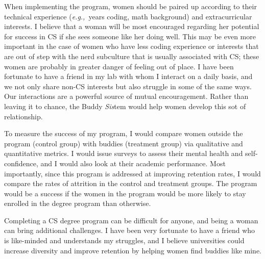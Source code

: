 \documentclass{article}
\newcommand{\eg}{{\em e.g.,}~}
\begin{document}
When implementing the program, women should be paired up according to their technical experience (\eg years coding, math background) and extracurricular interests.
I believe that a woman will be most encouraged regarding her potential for success in CS if she sees someone like her doing well.
This may be even more important in the case of women who have less coding experience or interests that are out of step with the nerd subculture that is usually associated with CS; these women are probably in greater danger of feeling out of place.
I have been fortunate to have a friend in my lab with whom I interact on a daily basis, and we not only share non-CS interests but also struggle in some of the same ways.
Our interactions are a powerful source of mutual encouragement.
Rather than leaving it to chance, the Buddy \textit{Sis}tem would help women develop this sot of relationship.

To measure the success of my program, I would compare women outside the program (control group) with buddies (treatment group) via qualitative and quantitative metrics.
I would issue surveys to assess their mental health and self-confidence, and I would also look at their academic performance.
Most importantly, since this program is addressed at improving retention rates, I would compare the rates of attrition in the control and treatment groups.
The program would be a success if the women in the program would be more likely to stay enrolled in the degree program than otherwise.

Completing a CS degree program can be difficult for anyone, and being a woman can bring additional challenges.
I have been very fortunate to have a friend who is like-minded and understands my struggles, and I believe universities could increase diversity and improve retention by helping women find buddies like mine.
\end{document}
